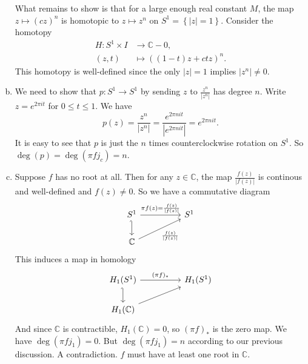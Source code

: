 \documentclass[a4paper, 12pt]{article}
\begin{document}
\begin{solution}
\begin{enumerate}[(a)]
What remains to show is that for a large enough real constant \(M\), the map \(z\mapsto (cz)^n\) is homotopic to \(z\mapsto z^n\) on \(S^1=\left\{ |z|=1 \right\}\). Consider the homotopy 
\begin{align*}
	H:S^1\times I&\rightarrow \mathbb{C}-0,\\ 
	 (z,t)&\mapsto ((1-t)z+ctz)^n.
\end{align*}
This homotopy is well-defined since the only \(|z|=1\) implies \(|z^n|\neq 0\).
\item We need to show that \(p:S^1\rightarrow S^1\) by sending \(z\) to \(\frac{z^n}{|z^n|}\) has degree \(n\). Write \(z=e^{2\pi it}\) for \(0\leq t\leq 1\). We have 
\[p(z)=\frac{z^n}{|z^n|}=\frac{e^{2\pi nit}}{|e^{2\pi nit}|}=e^{2\pi nit}.\]
It is easy to see that \(p\) is just the \(n\) times counterclockwise rotation on \(S^1\). So \(\deg (p)=\deg (\pi fj_c)=n\).
\item Suppose \(f\) has no root at all. Then for any \(z\in \mathbb{C}\), the map \(\frac{f(z)}{|f(z)|}\) is continous and well-defined and \(f(z)\neq 0\). So we have a commutative diagram 
\[\begin{tikzcd}
	{S^1} && {S^1} \\
	{\mathbb{C}}
	\arrow["{\pi f(z)=\frac{f(z)}{|f(z)|}}", from=1-1, to=1-3]
	\arrow[hook', from=1-1, to=2-1]
	\arrow["{\frac{f(z)}{|f(z)|}}"', from=2-1, to=1-3]
\end{tikzcd}\]
This induces a map in homology 
\[\begin{tikzcd}
	{H_1(S^1)} && {H_1(S^1)} \\
	{H_1(\mathbb{C})}
	\arrow["{(\pi f)_*}", from=1-1, to=1-3]
	\arrow[hook', from=1-1, to=2-1]
	\arrow[from=2-1, to=1-3]
\end{tikzcd}\]
And since \(\mathbb{C}\) is contractible, \(H_1(\mathbb{C})=0\), so \((\pi f)_*\) is the zero map. We have \(\deg(\pi fj_1)=0\). But \(\deg(\pi fj_1)=n\) according to our previous discussion. A contradiction. \(f\) must 
have at least one root in \(\mathbb{C}\).
\end{enumerate}
\end{solution}
\end{document}
